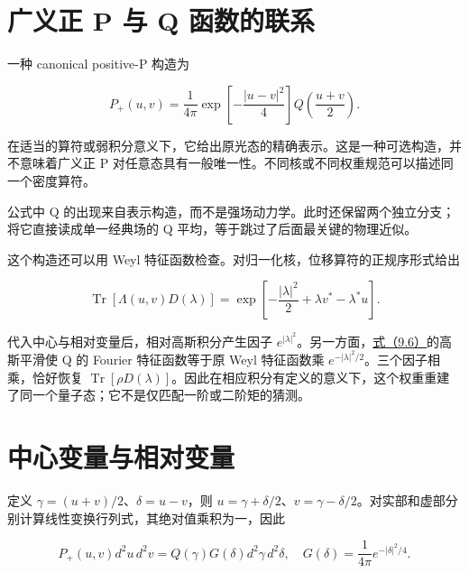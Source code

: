 \documentclass[UTF8,a4paper,zihao=-4,openany,fontset=fandol]{ctexbook}
\begin{document}
\section{广义正 P 与 Q 函数的联系}\label{sec:10:6}


一种 canonical positive-P 构造为



\begin{equation*}
P_+(u,v)=\frac1{4\pi}
\exp\!\left[-\frac{|u-v|^2}{4}\right]
Q\!\left(\frac{u+v}{2}\right).
\tag{10.3}\label{eq:10.3}
\end{equation*}


在适当的算符或弱积分意义下，它给出原光态的精确表示。这是一种可选构造，并不意味着广义正 P 对任意态具有一般唯一性。不同核或不同权重规范可以描述同一个密度算符。



公式中 Q 的出现来自表示构造，而不是强场动力学。此时还保留两个独立分支；将它直接读成单一经典场的 Q 平均，等于跳过了后面最关键的物理近似。



这个构造还可以用 Weyl 特征函数检查。对归一化核，位移算符的正规序形式给出



\begin{equation*}
\operatorname{Tr}[\Lambda(u,v)D(\lambda)]
=\exp\!\left[-\frac{|\lambda|^2}{2}
+\lambda v^*-\lambda^*u\right].
\tag{10.4}\label{eq:10.4}
\end{equation*}


代入中心与相对变量后，相对高斯积分产生因子 $e^{|\lambda|^2}$。另一方面，\hyperref[eq:9.6]{式（9.6）}的高斯平滑使 Q 的 Fourier 特征函数等于原 Weyl 特征函数乘 $e^{-|\lambda|^2/2}$。三个因子相乘，恰好恢复 $\operatorname{Tr}[\rho D(\lambda)]$。因此在相应积分有定义的意义下，这个权重重建了同一个量子态；它不是仅匹配一阶或二阶矩的猜测。



\section{中心变量与相对变量}\label{sec:10:7}


定义 $\gamma=(u+v)/2$、$\delta=u-v$，则 $u=\gamma+\delta/2$、$v=\gamma-\delta/2$。对实部和虚部分别计算线性变换行列式，其绝对值乘积为一，因此



\begin{equation*}
P_+(u,v)d^2u\,d^2v
=Q(\gamma)G(\delta)d^2\gamma\,d^2\delta,
\quad G(\delta)=\frac1{4\pi}e^{-|\delta|^2/4}.
\tag{10.5}\label{eq:10.5}
\end{equation*}
\end{document}
